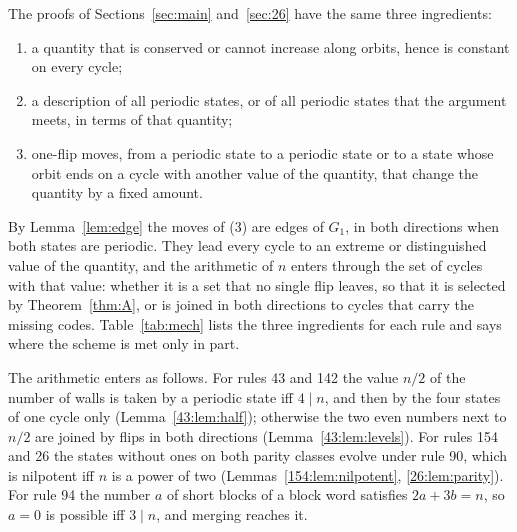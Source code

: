 \documentclass[10pt,a4paper]{article}
\newcommand{\Gone}{G_1}                       %
\begin{document}
The proofs of Sections~\ref{sec:main} and~\ref{sec:26} have the same three ingredients:
\begin{enumerate}[label=\textup{(\arabic*)},nosep,leftmargin=2.2em]
\item a quantity that is conserved or cannot increase along orbits, hence is constant on every cycle;
\item a description of all periodic states, or of all periodic states that the argument meets, in terms of that
quantity;
\item one-flip moves, from a periodic state to a periodic state or to a state whose orbit ends on a cycle with
another value of the quantity, that change the quantity by a fixed amount.
\end{enumerate}
By Lemma~\ref{lem:edge} the moves of (3) are edges of $\Gone$, in both directions when both states are periodic. They
lead every cycle to an extreme or distinguished value of the quantity, and the arithmetic of $n$ enters through the
set of cycles with that value: whether it is a set that no single flip leaves, so that it is selected by
Theorem~\ref{thm:A}, or is joined in both directions to cycles that carry the missing codes. Table~\ref{tab:mech}
lists the three ingredients for each rule and says where the scheme is met only in part.

The arithmetic enters as follows. For rules 43 and 142 the value $n/2$ of the number of walls is taken by a
periodic state iff $4\mid n$, and then by the four states of one cycle only (Lemma~\ref{43:lem:half}); otherwise
the two even numbers next to $n/2$ are joined by flips in both directions (Lemma~\ref{43:lem:levels}). For rules 154
and 26 the states without ones on both parity classes evolve under rule 90, which is nilpotent iff $n$ is a power of
two (Lemmas~\ref{154:lem:nilpotent}, \ref{26:lem:parity}). For rule 94 the number $a$ of short blocks of a block
word satisfies $2a+3b=n$, so $a=0$ is possible iff $3\mid n$, and merging reaches it.
\end{document}
